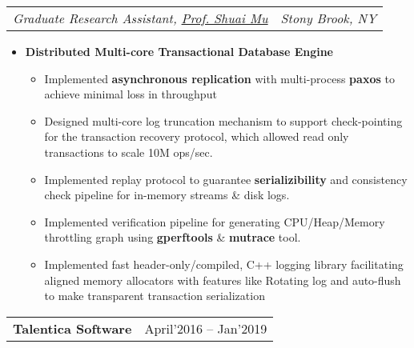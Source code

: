 \documentclass[letterpaper,11pt]{article}
\makeatletter
\newcommand{\resumeSubListItemWithoutDesc}[1]{
  \vspace{2pt}\item\small{
    { #1 \vspace{-2pt}}
  }
}
\newcommand{\resumeItemSubListHeading}[1]{
 \vspace{1pt}\item\small{
    \textbf{#1}\vspace{-1pt}
  }
}
\newcommand{\resumeSubheading}[2]{
  \vspace{-1pt}\item
    \begin{tabular*}{0.97\textwidth}[t]{l@{\extracolsep{\fill}}r}
      \textbf{#1} & #2 \\
    \end{tabular*}\vspace{-5pt}
}
\newcommand{\resumeItemListHeading}[2]{
    \begin{tabular*}{0.97\textwidth}[t]{l@{\extracolsep{\fill}}r}
      \textit{#1} & \textit{\small #2} \\
    \end{tabular*}\vspace{-5pt}
}
\newcommand{\resumeItemListStart}{\begin{itemize}}
\newcommand{\resumeItemSubListStart}{\begin{itemize}}
\newcommand{\resumeItemSubListEnd}{\end{itemize}\vspace{-5pt}}
\newcommand{\resumeItemListEnd}{\end{itemize}\vspace{-5pt}}
\makeatother
\begin{document}
      \vspace*{4px}
      \resumeItemListHeading{Graduate Research Assistant, {\href{http://mpaxos.com/}{\color{blue}Prof. Shuai Mu}}}{Stony Brook, NY}
      \resumeItemListStart
        \resumeItemSubListHeading{Distributed Multi-core Transactional Database Engine}
            \resumeItemSubListStart
                \resumeSubListItemWithoutDesc
                {Implemented \textbf{asynchronous replication} with multi-process \textbf{paxos} to achieve minimal loss in throughput}
                \resumeSubListItemWithoutDesc
                {Designed multi-core log truncation mechanism to support check-pointing for the transaction recovery protocol, which allowed read only transactions to scale 10M ops/sec.}
                \resumeSubListItemWithoutDesc
                {Implemented replay protocol to guarantee \textbf{serializibility} and consistency check pipeline for in-memory streams \& disk logs.}
                \resumeSubListItemWithoutDesc
                {Implemented verification pipeline for generating CPU/Heap/Memory throttling graph using \textbf{gperftools} \& \textbf{mutrace} tool.}
                \resumeSubListItemWithoutDesc
                {Implemented fast header-only/compiled, C++ logging library facilitating aligned memory allocators with features like Rotating log and auto-flush to make transparent transaction serialization}
                \newline
            \resumeItemSubListEnd
      \resumeItemListEnd
    \resumeSubheading
      {Talentica Software}{April'2016 -- Jan'2019}
      
\end{document}
